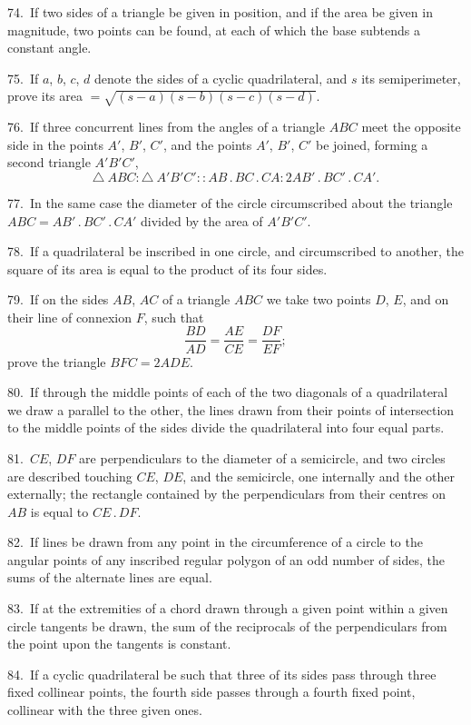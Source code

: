 \documentclass[oneside]{book}
\begin{document}
\begin{footnotesize}
74.~If two sides of a triangle
be given in position,
and if the area be given in
magnitude, two points can be found, at each of which the base
subtends a constant angle.

75.~If $a$, $b$, $c$, $d$ denote the sides of a cyclic quadrilateral, and $s$
its semiperimeter, prove its area $= \sqrt{(s-a)(s-b)(s-c)(s-d)}$.

76.~If three concurrent lines from the angles of a triangle $ABC$
meet the opposite side in the points $A'$, $B'$, $C'$, and the points
$A'$, $B'$, $C'$ be joined, forming a second triangle $A'B'C'$,
\[
\triangle\ ABC : \triangle\ A'B'C' :: AB\,.\,BC\,.\,CA : 2AB'\,.\,BC'\,.\,CA'.
\]

77.~In the same case the diameter of the circle circumscribed
about the triangle $ABC = AB'\,.\,BC'\,.\,CA'$ divided by the area of
$A'B'C'$.

78.~If a quadrilateral be inscribed in one circle, and circumscribed
to another, the square of its area is equal to the product
of its four sides.

79.~If on the sides $AB$, $AC$ of a triangle $ABC$ we take two
points $D$, $E$, and on their line of connexion $F$, such that
\[
\frac{BD}{AD}=\frac{AE}{CE}=\frac{DF}{EF};
\]
prove the triangle $BFC=2ADE$.

80.~If through the middle points of each of the two diagonals
of a quadrilateral we draw a parallel to the other, the lines drawn
from their points of intersection to the middle points of the sides
divide the quadrilateral into four equal parts.

81.~$CE$, $DF$ are perpendiculars to the diameter of a semicircle,
and two circles are described touching $CE$, $DE$, and the semicircle,
one internally and the other externally; the rectangle contained by
the perpendiculars from their centres on $AB$ is equal to $CE\,.\,DF$.

82.~If lines be drawn from any point in the circumference of a
circle to the angular points of any inscribed regular polygon of an
odd number of sides, the sums of the alternate lines are equal.

83.~If at the extremities of a chord drawn through a given
point within a given circle tangents be drawn, the sum of the
reciprocals of the perpendiculars from the point upon the tangents
is constant.

84.~If a cyclic quadrilateral be such that three of its sides pass
through three fixed collinear points, the fourth side passes through
a fourth fixed point, collinear with the three given ones.


\end{footnotesize}
\end{document}

